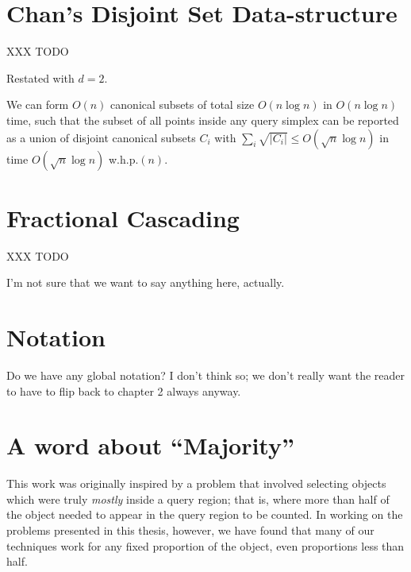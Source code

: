 \section{Chan's Disjoint Set Data-structure}
\label{:prelim:chan}

XXX TODO

Restated with $d=2$.

\begin{theorem}
\label{th:chan}
We can form $O(n)$ canonical subsets of total size $O(n \log{n})$ in $O(n \log{n})$ time, such that the subset of all points inside any query simplex can be reported as a union of disjoint canonical subsets $C_i$ with $\sum_i{\sqrt{|C_i|}} \leq O(\sqrt{n}\log{n})$ in time $O(\sqrt{n}\log{n})$ w.h.p.$(n)$.
\end{theorem}


\section{Fractional Cascading}
\label{:prelim:fractional-cascading}

XXX TODO

I'm not sure that we want to say anything here, actually.


\section{Notation}
\label{:prelim:notation}

Do we have any global notation?  I don't think so;  we don't really want the reader to have to flip back to chapter 2 always anyway.


\section{A word about ``Majority''}

This work was originally inspired by a problem that involved selecting objects which were truly \emph{mostly} inside a query region; that is, where more than half of the object needed to appear in the query region to be counted.  In working on the problems presented in this thesis, however, we have found that many of our techniques work for any fixed proportion of the object, even proportions less than half.


